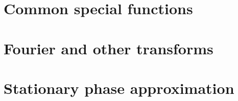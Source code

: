 \documentclass[12pt]{report}
\theoremstyle{definition}
\begin{document}
\chapter{Common special functions}
\label{chap:special-functions}


\chapter{Fourier and other transforms}
\label{chap:fourier-transforms}


\chapter{Stationary phase approximation}
\label{chap:stationary-phase}


\cleardoublepage 
  
\end{document}
